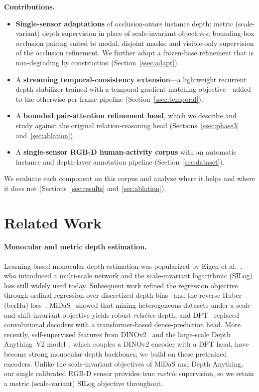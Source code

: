 \documentclass[sigconf, review=true]{acmart}
\begin{document}
\smallskip\noindent\textbf{Contributions.}
\begin{itemize}
  \item \textbf{Single-sensor adaptations} of occlusion-aware instance depth:
    metric (scale-variant) depth supervision in place of scale-invariant
    objectives; bounding-box occlusion pairing suited to modal, disjoint masks;
    and visible-only supervision of the occlusion refinement. We further adopt a
    frozen-base refinement that is non-degrading by construction
    (Section~\ref{ssec:adapt}).
  \item A \textbf{streaming temporal-consistency extension}---a lightweight
    recurrent depth stabilizer trained with a temporal-gradient-matching
    objective---added to the otherwise per-frame pipeline
    (Section~\ref{ssec:temporal}).
  \item A \textbf{bounded pair-attention refinement head}, which we describe and
    study against the original relation-reasoning head
    (Sections~\ref{ssec:phase3} and~\ref{sec:ablation}).
  \item A \textbf{single-sensor RGB-D human-activity corpus} with an automatic
    instance and depth-layer annotation pipeline (Section~\ref{sec:dataset}).
\end{itemize}
We evaluate each component on this corpus and analyze where it helps and where
it does not (Sections~\ref{sec:results} and~\ref{sec:ablation}).

\section{Related Work}
\label{sec:related}

\paragraph{Monocular and metric depth estimation.}
Learning-based monocular depth estimation was popularized by Eigen et
al.~\cite{eigen2014silog}, who introduced a multi-scale network and the
scale-invariant logarithmic (SILog) loss still widely used today. Subsequent
work refined the regression objective through ordinal regression over
discretized depth bins~\cite{fu2018dorn} and the reverse-Huber (berHu)
loss~\cite{laina2016berhu}. MiDaS~\cite{ranftl2022midas} showed that mixing
heterogeneous datasets under a scale-and-shift-invariant objective yields
robust \emph{relative} depth, and DPT~\cite{ranftl2021dpt} replaced
convolutional decoders with a transformer-based dense-prediction head. More
recently, self-supervised features from DINOv2~\cite{oquab2024dinov2} and the
large-scale Depth Anything~V2 model~\cite{yang2024depthanythingv2}, which
couples a DINOv2 encoder with a DPT head, have become strong monocular-depth
backbones; we build on these pretrained encoders. Unlike the scale-invariant
objectives of MiDaS and Depth Anything, our single calibrated RGB-D sensor
provides true \emph{metric} supervision, so we retain a metric (scale-variant)
SILog objective throughout.
\end{document}
